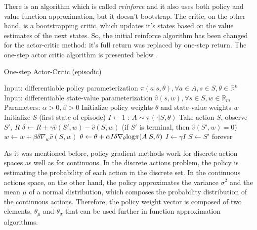 There is an algorithm which is called \textit{reinforce} and it also uses both policy and value function approximation, but it doesn't bootstrap. The critic, on the other hand, is a bootstrapping critic, which updates it's states based on the value estimates of the next states. So, the initial reinforce algorithm has been changed for the actor-critic method: it's full return was replaced by one-step return. The one-step actor critic algorithm is presented below \cite{Sutton}.
\begin{algorithm}[H]
\caption{One-step Actor-Critic (episodic)}
\label{algo:AC}
\begin{algorithmic}
\State Input: differentiable policy parameterization $\pi(a|s,\theta),\forall a\in A, s\in S,\theta\in\mathbb{R}^{n}$
\State Input: differentiable state-value parameterization $\hat{v}(s,w),\forall s \in S, w \in \mathbb{R}_{m}$
\State Parameters: $\alpha>0,\beta>0$
\State Initialize policy weights $\theta$ and state-value weights $w$
\Repeat
\State Initialize $S$ (first state of episode)
\State $I\leftarrow 1$
:
\State $A\sim \pi(\cdot|S,\theta)$
\State Take action $S$, observe $S'$, $R$
\State $\delta\leftarrow R+\gamma\hat{v}(S',w)-\hat{v}(S,w)$ (if $S'$ is terminal, then $\hat{v}(S',w)=0$)
\State $w\leftarrow w+\beta\delta\nabla_{w}\hat{v}(S,w)$
\State $\theta\leftarrow \theta+\alpha I \delta\nabla_{\theta} \textup{log} \pi(A|S,\theta)$
\State $I\leftarrow \gamma I$
\State $S\leftarrow S'$
\EndWhile
\Until forever
\end{algorithmic}
\end{algorithm}

As it was mentioned before, policy gradient methods work for discrete action spaces as well as for continuous. In the discrete actions problem, the policy is estimating the probability of each action in the discrete set. In the continuous actions space, on the other hand, the policy approximates the variance $\sigma^2$ and the mean $\mu$ of a normal distribution, which composes the probability distribution of the continuous actions. Therefore, the policy weight vector is composed of two elements, $\theta_{\mu}$ and $\theta_{\sigma}$ that can be used further in function approximation algorithms.